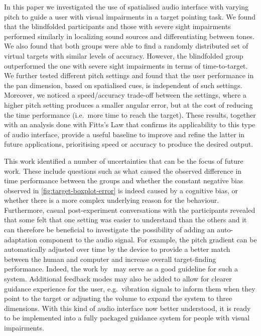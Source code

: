 \documentclass[acmsmall]{acmart}
\begin{document}
In this paper we investigated the use of spatialised audio interface with varying pitch to guide a user with visual impairments in a target pointing task.
We found that the blindfolded participants and those with severe sight impairments performed similarly in localizing sound sources and differentiating between tones. 
We also found that both groups were able to find a randomly distributed set of virtual targets with similar levels of accuracy.
However, the blindfolded group outperformed the one with severe sight impairments in terms of time-to-target. 
We further tested different pitch settings and found that the user performance in the pan dimension, based on spatialised cues, is independent of such settings.
Moreover, we noticed a speed/accuracy trade-off between the settings, where a higher pitch setting produces a smaller angular error, but at the cost of reducing the time performance (i.e.\ more time to reach the target). 
These results, together with an analysis done with Fitts's Law that confirms its applicability to this type of audio interface, provide a useful baseline to improve and refine the latter in future applications, prioritising speed or accuracy to produce the desired output.

This work identified a number of uncertainties that can be the focus of future work.
These include questions such as what caused the observed difference in time performance between the groups and whether the constant negative bias observed in \cref{fig:target-boxplot-error} is indeed caused by a cognitive bias, or whether there is a more complex underlying reason for the behaviour.
Furthermore, casual post-experiment conversations with the participants revealed that some felt that one setting was easier to understand than the others and it can therefore be beneficial to investigate the possibility of adding an auto-adaptation component to the audio signal.
For example, the pitch gradient can be automatically adjusted over time by the device to provide a better match between the human and computer and increase overall target-finding performance.
Indeed, the work by~\citet{gallina2015progressive} may serve as a good guideline for such a system.
Additional feedback modes may also be added to allow for clearer guidance experience for the user, e.g.\ vibration signals to inform them when they point to the target or adjusting the volume to expand the system to three dimensions.
With this kind of audio interface now better understood, it is ready to be implemented into a fully packaged guidance system for people with visual impairments.



\end{document}
